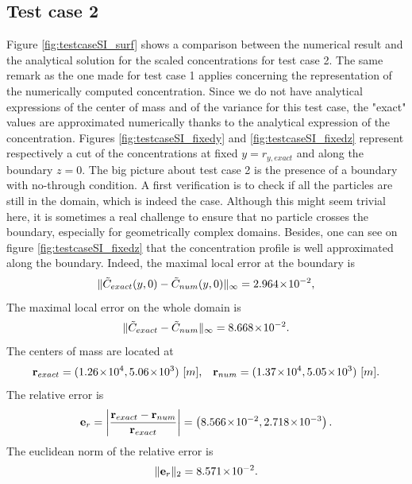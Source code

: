\subsection{Test case 2}
Figure \ref{fig:testcaseSI_surf} shows a comparison between the numerical result and the analytical solution for the scaled concentrations for test case 2. The same remark as the one made for test case 1 applies concerning the representation of the numerically computed concentration. Since we do not have analytical expressions of the center of mass and of the variance for this test case, the "exact" values are approximated numerically thanks to the analytical expression of the concentration. Figures \ref{fig:testcaseSI_fixedy} and \ref{fig:testcaseSI_fixedz} represent respectively a cut of the concentrations at fixed $y = r_{y,exact}$ and along the boundary $z = 0$. The big picture about test case 2 is the presence of a boundary with no-through condition. A first verification is to check if all the particles are still in the domain, which is indeed the case. Although this might seem trivial here, it is sometimes a real challenge to ensure that no particle crosses the boundary, especially for geometrically complex domains. Besides, one can see on figure \ref{fig:testcaseSI_fixedz} that the concentration profile is well approximated along the boundary. Indeed, the maximal local error at the boundary is
\begin{equation}
	\|\tilde C_{exact}(y,0)- \tilde C_{num}(y,0)\|_{\infty} = 2.964\!\times\!10^{-2}, 
\end{equation}
The maximal local error on the whole domain is 
\begin{equation}
	\|\tilde C_{exact}- \tilde C_{num}\|_{\infty} = 8.668\!\times\!10^{-2}.
\end{equation}
The centers of mass are located at
\begin{equation}
	\b r_{exact} = (1.26\e{4},5.06\e{3}) \mbox{ [$m$],}\quad \b r_{num} = (1.37\e{4},5.05\e{3}) \mbox{ [$m$]}.
\end{equation}
The relative error is
\begin{equation}
	\mathbf e_r = \left \lvert \frac{\mathbf r_{exact}-\mathbf r_{num}}{\mathbf r_{exact}} \right \rvert =  \left(8.566\!\times\!10^{-2}, 2.718\!\times\!10^{-3}\right).
\end{equation}
The euclidean norm of the relative error is
\begin{equation}
	\| \mathbf e_r \|_2 = 8.571\!\times\!10^{-2}.
\end{equation}
